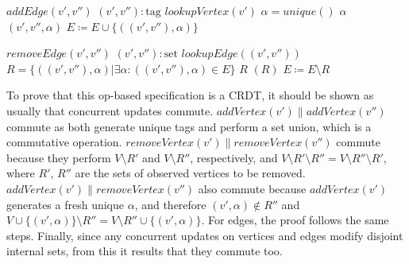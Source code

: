 \begin{algorithm}[t!]
{\begin{algorithmic}[1]
 	  \State \Update $addEdge(v', v'')$
 	  \State \hspace{\algorithmicindent} \Prepare $(v', v'') : \text{tag}$
 	  \State \hspace{\algorithmicindent}\hspace{\algorithmicindent} \Pre $lookupVertex(v')$
 	  \State \hspace{\algorithmicindent}\hspace{\algorithmicindent} \Let $\alpha = unique()$
 	  \State \hspace{\algorithmicindent}\hspace{\algorithmicindent} \Return $\alpha$
 	  \State \hspace{\algorithmicindent} \Effect $(v', v'', \alpha)$ 
 	  \State \hspace{\algorithmicindent}\hspace{\algorithmicindent} $E \coloneqq E \cup \{((v', v''), \alpha)\}$
 	  
 	  \State \Update $removeEdge(v', v'')$
 	  \State \hspace{\algorithmicindent} \Prepare $(v', v'') : \text{set}$
 	  \State \hspace{\algorithmicindent}\hspace{\algorithmicindent} \Pre $lookupEdge((v', v''))$
 	  \State \hspace{\algorithmicindent}\hspace{\algorithmicindent} \Let $R = \{((v', v''), \alpha) | \exists \alpha : ((v', v''), \alpha) \in E\}$
 	  \State \hspace{\algorithmicindent}\hspace{\algorithmicindent} \Return $R$
 	  \State \hspace{\algorithmicindent} \Effect $(R)$ 
 	  \State \hspace{\algorithmicindent}\hspace{\algorithmicindent} $E \coloneqq E \setminus R$
	\end{algorithmic}
 }
\end{algorithm}

To prove that this op-based specification is a CRDT, it should be shown as
usually that concurrent updates commute. $\textit{addVertex}(v') \parallel
\textit{addVertex}(v'')$ commute as both generate unique tags and perform a
set union, which is a commutative operation. $\textit{removeVertex}(v')
\parallel \textit{removeVertex}(v'')$ commute because they perform $V \setminus
R'$ and $V \setminus R''$, respectively, and $V \setminus R' \setminus R'' = V
\setminus R'' \setminus R'$, where $R'$, $R''$ are the sets of observed vertices
to be removed. $\textit{addVertex}(v') \parallel \textit{removeVertex}(v'')$
also commute because $\textit{addVertex}(v')$ generates a fresh unique $\alpha$,
and therefore $(v', \alpha) \not\in R''$ and $V \cup \{(v', \alpha)\} \setminus
R'' = V \setminus R'' \cup \{(v', \alpha)\}$. For edges, the proof follows the
same steps. Finally, since any concurrent updates on vertices and edges modify
disjoint internal sets, from this it results that they commute too.

